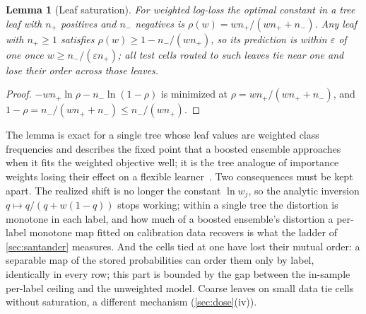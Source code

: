 \documentclass[sigconf,nonacm]{acmart}
\newtheorem{lemma}{Lemma}
\begin{document}
\begin{lemma}[Leaf saturation]
\label{lem:leaf}
For weighted log-loss the optimal constant in a tree leaf with $n_+$ positives and $n_-$ negatives is $\rho(w)=wn_+/(wn_++n_-)$. Any leaf with $n_+\ge1$ satisfies $\rho(w)\ge1-n_-/(wn_+)$, so its prediction is within $\varepsilon$ of one once $w\ge n_-/(\varepsilon n_+)$; all test cells routed to such leaves tie near one and lose their order across those leaves.
\end{lemma}
\begin{proof}
$-wn_+\ln\rho-n_-\ln(1-\rho)$ is minimized at $\rho=wn_+/(wn_++n_-)$, and $1-\rho=n_-/(wn_++n_-)\le n_-/(wn_+)$.
\end{proof}
The lemma is exact for a single tree whose leaf values are weighted class frequencies and describes the fixed point that a boosted ensemble approaches when it fits the weighted objective well; it is the tree analogue of importance weights losing their effect on a flexible learner~\cite{Byrd2019}. Two consequences must be kept apart. The realized shift is no longer the constant $\ln w_j$, so the analytic inversion $q\mapsto q/(q+w(1-q))$ stops working; within a single tree the distortion is monotone in each label, and how much of a boosted ensemble's distortion a per-label monotone map fitted on calibration data recovers is what the ladder of \cref{sec:santander} measures. And the cells tied at one have lost their mutual order: a separable map of the stored probabilities can order them only by label, identically in every row; this part is bounded by the gap between the in-sample per-label ceiling and the unweighted model. Coarse leaves on small data tie cells without saturation, a different mechanism (\cref{sec:dose}(iv)).
\end{document}
